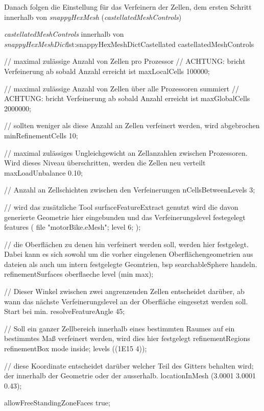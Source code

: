 Danach folgen die Einstellung für das Verfeinern der Zellen, dem ersten Schritt innerhalb von \textit{snappyHexMesh} (\textit{castellatedMeshControls})

\begin{dict}{\textit{castellatedMeshControls} innerhalb von \textit{snappyHexMeshDict}}{lst:snappyHexMeshDictCastellated}
castellatedMeshControls
{
	// maximal zulässige Anzahl von Zellen pro Prozessor
	// ACHTUNG: bricht Verfeinerung ab sobald Anzahl erreicht ist
    maxLocalCells 100000;

	// maximal zulässige Anzahl von Zellen über alle Prozessoren summiert
    // ACHTUNG: bricht Verfeinerung ab sobald Anzahl erreicht ist
    maxGlobalCells 2000000;

	// sollten weniger als diese Anzahl an Zellen verfeinert werden, wird abgebrochen
    minRefinementCells 10;

	// maximal zulässiges Ungleichgewicht an Zellanzahlen zwischen Prozessoren. Wird dieses Niveau überschritten, werden die Zellen neu verteilt
    maxLoadUnbalance 0.10;

	// Anzahl an Zellschichten zwischen den Verfeinerungen
    nCellsBetweenLevels 3;

	// wird das zusätzliche Tool surfaceFeatureExtract genutzt wird die davon generierte Geometrie hier eingebunden und das Verfeinerungslevel festegelegt
    features
    (
        {
            file "motorBike.eMesh";
            level 6;
        }
    );

	// die Oberflächen zu denen hin verfeinert werden soll, werden hier festgelegt. Dabei kann es sich sowohl um die vorher eingelenen Oberflächengeometrien aus dateien als auch um intern festgelegte Geomtrien, bsp searchableSphere handeln.
    refinementSurfaces
    {
        oberflaeche
        {
            level (min max);
        }
    }

	// Dieser Winkel zwischen zwei angrenzenden Zellen entscheidet darüber, ab wann das nächste Verfeinerungslevel an der Oberfläche eingesetzt werden soll. Start bei min.
    resolveFeatureAngle 45;

	// Soll ein ganzer Zellbereich innerhalb eines bestimmten Raumes auf ein bestimmtes Maß verfeinert werden, wird dies hier festgelegt
    refinementRegions
    {
        refinementBox
        {
            mode inside;
            levels ((1E15 4));
        }
    }

	// diese Koordinate entscheidet darüber welcher Teil des Gitters behalten wird; der innerhalb der Geometrie oder der ausserhalb.
    locationInMesh (3.0001 3.0001 0.43);

    allowFreeStandingZoneFaces true;
}\end{dict}

